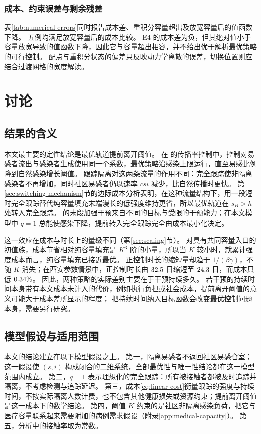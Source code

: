 \documentclass[11pt,a4paper,UTF8]{ctexart}
\theoremstyle{definition}
\begin{document}
\NumFindingParagraph{\NumFindingTrackingBoundary}

\subsubsection{成本、约束误差与剩余残差}

表\ref{tab:numerical-errors}同时报告成本差、重积分容量超出及放宽容量后的值函数下降。
五例均满足放宽容量后的成本比较。
E4 的成本差为负，但其绝对值小于容量放宽导致的值函数下降，因此它与容量超出相容，并不给出优于解析最优策略的可行控制。
配点与重积分状态的偏差只反映动力学离散的误差，切换位置则应结合过渡网格的宽度解读。

\NumFindingParagraph{\NumResidualSummary}
\FloatBarrier

\section{讨论}
\label{sec:discussion}

\subsection{结果的含义}
\label{sec:interpretation}
本文最主要的定性结论是最优轨道提前离开阈值。
在 \citet{MicloSpiroWeibull2022} 的传播率控制中，控制对易感者流出与感染者生成使用同一个系数，最优策略沿感染上限运行，直至易感比例降到自然感染增长阈值。
跟踪隔离对这两条流量的作用不同：完全跟踪使非隔离感染者不再增加，同时社区易感者仍以速率 $csi$ 减少，比自然传播时更快。
第\ref{sec:switching-mechanism}节的边际成本分析表明，在这种流量结构下，用一段短时完全跟踪替代纯容量填充末端漫长的低强度维持更省，所以最优轨道在 $s_B>h$ 处转入完全跟踪。
\citet{Angulo2021} 的末段加强干预来自不同的目标与受限的干预能力；在本文模型中 $q=1$ 总能使感染下降，提前转入完全跟踪完全由成本最小化决定。

这一效应在成本与时长上的量级不同（第\ref{sec:scaling}节）。
对具有共同容量入口的初值族，成本节省相对纯容量填充是 $K^3$ 阶的小量，所以当 $K$ 较小时，就累计强度成本而言，纯容量填充已接近最优。
正控制时长的缩短量却趋于 $1/(\beta\gamma)$，不随 $K$ 消失；在西安参数情景中，正控制时长由 $32.5$ 日缩短至 $24.3$ 日，而成本只低 $0.34\%$。
因此，两种策略的实际差别主要在于干预持续多久。
若干预的持续时间本身带有本文成本未计入的代价，例如执行负担或社会成本，提前离开阈值的意义可能大于成本差所显示的程度；
把持续时间纳入目标函数会改变最优控制问题本身，需要另行研究。

\subsection{模型假设与适用范围}
\label{sec:limitations}
本文的结论建立在以下模型假设之上。
第一，隔离易感者不返回社区易感仓室；这一假设使 $(s,i)$ 构成闭合的二维系统，全部最优性与唯一性结论都在这一模型范围内成立。
第二，$q=1$ 表示理想化的完全跟踪：所有被接触者都被及时追踪并隔离，不考虑检测与追踪延迟\citep{Kretzschmar2020}。
第三，成本\eqref{eq:linear-cost}衡量跟踪的强度与持续时间，不按实际隔离人数计费，也不包含其他健康损失或资源约束；提前离开阈值是这一成本下的数学结论。
第四，阈值 $K$ 约束的是社区非隔离感染负荷，把它与医疗容量联系起来需要附加的病例需求假设（附录\ref{app:medical-capacity}）。
第五，分析中的接触率取为常数。
\end{document}

